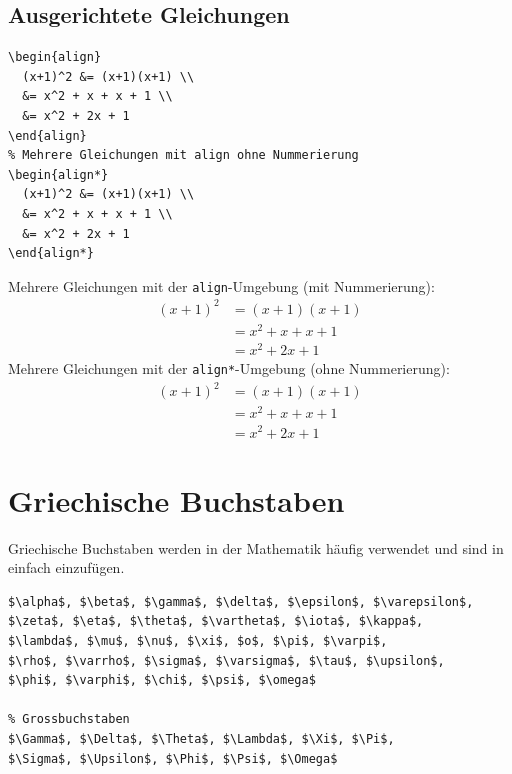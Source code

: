 \documentclass[12pt,a4paper]{article}
\begin{document}
\subsection{Ausgerichtete Gleichungen}

\begin{lstlisting}[style=latex]
% Mehrere Gleichungen mit align
\begin{align}
  (x+1)^2 &= (x+1)(x+1) \\
  &= x^2 + x + x + 1 \\
  &= x^2 + 2x + 1
\end{align}
% Mehrere Gleichungen mit align ohne Nummerierung
\begin{align*}
  (x+1)^2 &= (x+1)(x+1) \\
  &= x^2 + x + x + 1 \\
  &= x^2 + 2x + 1
\end{align*}
\end{lstlisting}

\begin{ausgabe}
Mehrere Gleichungen mit der \texttt{align}-Umgebung (mit Nummerierung):
\begin{align}
  (x+1)^2 &= (x+1)(x+1) \\
  &= x^2 + x + x + 1 \\
  &= x^2 + 2x + 1
\end{align}
Mehrere Gleichungen mit der \texttt{align*}-Umgebung (ohne Nummerierung):
\begin{align*}
  (x+1)^2 &= (x+1)(x+1) \\
  &= x^2 + x + x + 1 \\
  &= x^2 + 2x + 1
\end{align*}
\end{ausgabe}

\section{Griechische Buchstaben}

Griechische Buchstaben werden in der Mathematik häufig verwendet und sind in  einfach einzufügen.

\begin{lstlisting}[style=latex]
% Kleinbuchstaben
$\alpha$, $\beta$, $\gamma$, $\delta$, $\epsilon$, $\varepsilon$, 
$\zeta$, $\eta$, $\theta$, $\vartheta$, $\iota$, $\kappa$, 
$\lambda$, $\mu$, $\nu$, $\xi$, $o$, $\pi$, $\varpi$, 
$\rho$, $\varrho$, $\sigma$, $\varsigma$, $\tau$, $\upsilon$, 
$\phi$, $\varphi$, $\chi$, $\psi$, $\omega$

% Grossbuchstaben
$\Gamma$, $\Delta$, $\Theta$, $\Lambda$, $\Xi$, $\Pi$, 
$\Sigma$, $\Upsilon$, $\Phi$, $\Psi$, $\Omega$
\end{lstlisting}
\end{document}

